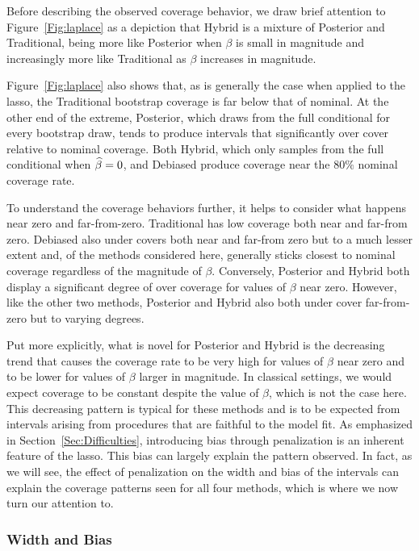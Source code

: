 Before describing the observed coverage behavior, we draw brief attention to Figure~\ref{Fig:laplace} as a depiction that Hybrid is a mixture of Posterior and Traditional, being more like Posterior when $\beta$ is small in magnitude and increasingly more like Traditional as $\beta$ increases in magnitude.

Figure~\ref{Fig:laplace} also shows that, as is generally the case when applied to the lasso, the Traditional bootstrap coverage is far below that of nominal. At the other end of the extreme, Posterior, which draws from the full conditional for every bootstrap draw, tends to produce intervals that significantly over cover relative to nominal coverage. Both Hybrid, which only samples from the full conditional when $\widehat{\beta} = 0$, and Debiased produce coverage near the $80\%$ nominal coverage rate.


To understand the coverage behaviors further, it helps to consider what happens near zero and far-from-zero. Traditional has low coverage both near and far-from zero. Debiased also under covers both near and far-from zero but to a much lesser extent and, of the methods considered here, generally sticks closest to nominal coverage regardless of the magnitude of $\beta$. Conversely, Posterior and Hybrid both display a significant degree of over coverage for values of $\beta$ near zero. However, like the other two methods, Posterior and Hybrid also both under cover far-from-zero but to varying degrees. 

Put more explicitly, what is novel for Posterior and Hybrid is the decreasing trend that causes the coverage rate to be very high for values of $\beta$ near zero and to be lower for values of $\beta$ larger in magnitude. In classical settings, we would expect coverage to be constant despite the value of $\beta$, which is not the case here. This decreasing pattern is typical for these methods and is to be expected from intervals arising from procedures that are faithful to the model fit. As emphasized in Section~\ref{Sec:Difficulties}, introducing bias through penalization is an inherent feature of the lasso. This bias can largely explain the pattern observed. In fact, as we will see, the effect of penalization on the width and bias of the intervals can explain the coverage patterns seen for all four methods, which is where we now turn our attention to.

\subsubsection{Width and Bias}\label{Sec:Width and Bias}

